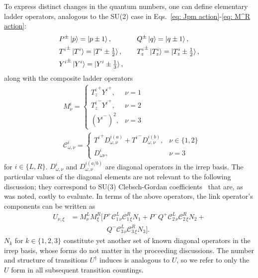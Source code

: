 \documentclass[aps,prd,twocolumn,showpacs,groupedaddress,superscriptaddress,nofootinbib,floatfix,preprintnumbers,longbibliography]{revtex4-1}
\begin{document}
To express distinct changes in the quantum numbers, one can define elementary ladder operators, analogous to the SU(2) case in Eqs.~\eqref{eq: Jpm action}-\eqref{eq: M^R action}:
%
\begin{alignat}{4}
    &P^{\pm} \ket{p} = \ket{p \pm 1} , & &Q^{\pm} \ket{q} = \ket{q \pm 1} , \\
    &{T^{i}}^\pm \ket{T^i} = \ket{T^i \pm \tfrac{1}{2}} , & \ \ \ &{T^{i}_z}^\pm \ket{T^{i}_z} = \ket{T^{i}_z \pm \tfrac{1}{2}} , \\
    &{Y^i}^\pm \ket{Y^i} = \ket{Y^i \pm \tfrac{1}{3}},
\end{alignat}
%
along with the composite ladder operators~\cite{Byrnes:2005qx}
%
\begin{align}
    &M_\nu^i = \left\{ \begin{array}{ll}
         {T^{i}_z}^+ {Y^{i}}^+ , & \nu = 1 \\
         {T^{i}_z}^- {Y^i}^{+} , & \nu = 2 \\
         ({Y^i}^{-})^2 , & \nu = 3
    \end{array} \right. \\
    &\mathcal{C}^{i}_{\omega,\nu} = \left\{ \begin{array}{ll}
         {T^i}^+ {D}^{i(a)}_{\omega,\nu} + {T^i}^- D^{i(b)}_{\omega,\nu} , & \nu \in \{ 1,2 \} \\
         D^{i}_{\omega\nu} , & \nu = 3
    \end{array} \right.
\end{align}
%
for $i \in \{L,R\}$. $D_{\omega,\nu}^{i}$ and $D_{\omega,\nu}^{i(a/b)}$ are diagonal operators in the irrep basis. The particular values of the diagonal elements are not relevant to the following discussion; they correspond to SU(3) Clebsch-Gordan coefficients~\cite{Kan:2021xfc} that are, as was noted, costly to evaluate. In terms of the above operators, the link operator's components can be written as
%
\begin{align}
    U_{\nu,\xi} &= M^L_\nu M^R_\xi \bigl[ P^+ \mathcal{C}_{1 \, \nu}^L \mathcal{C}_{1 \, \xi}^R N_1 + P^- Q^+ \mathcal{C}_{2 \, \nu}^L \mathcal{C}_{2 \, \xi}^R N_2 + \nonumber\\
    & \qquad \qquad \quad \ Q^- \mathcal{C}_{3 \, \nu}^L \mathcal{C}_{3 \, \xi}^R N_3 \bigr].
    \label{eq:SU(3)-link-ladder}
\end{align}
%
$N_k$ for $k \in \{1,2,3\}$ constitute yet another set of known diagonal operators in the irrep basis, whose forms do not matter in the proceeding discussions. The number and structure of transitions $U^\dagger$ induces is analogous to $U$, so we refer to only the $U$ form in all subsequent transition countings.
\end{document}
